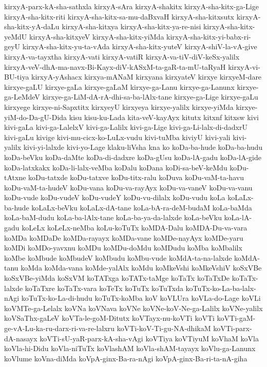 {kirxyA-parx-kA-sha-sathxla
kirxyA-sAra
kirxyA-shakitx
kirxyA-sha-kitx-ga-Lige
kirxyA-sha-kitx-riti
kirxyA-sha-kitx-sa-mu-daBxvaH
kirxyA-sha-kitxsutx
kirxyA-sha-kitx-yA-daLu
kirxyA-sha-kitxya
kirxyA-sha-kitx-ya-re-nisi
kirxyA-sha-kitx-yeMdU
kirxyA-sha-kitxyeV
kirxyA-sha-kitx-yiMda
kirxyA-sha-kitx-yi-babx-ri-geyU
kirxyA-sha-kitx-yu-ta-vAda
kirxyA-sha-kitx-yuteV
kirxyA-shiV-la-vA-give
kirxyA-va-tayxtha
kirxyA-vati
kirxyA-vatiR
kirxyA-va-tiV-diV-keSx-yalilx
kirxyA-veV-dhA-ma-navx-Bi-Kayx-diV-kASxM-ta-gaR-ta-mU-taRyaH
kirxyA-vi-BU-tiya
kirxyA-yAshacx
kirxya-mANaM
kirxyana
kirxyateV
kirxye
kirxyeM-dare
kirxye-gaLU
kirxye-gaLa
kirxye-gaLaM
kirxye-ga-Lanu
kirxye-ga-Lanunx
kirxye-ga-LeMdeV
kirxye-ga-LiM-dA-rA-dhi-sa-ba-lAlx-tane
kirxye-ga-Lige
kirxye-gaLu
kirxyege
kirxye-ni-Sapxtitx
kirxyeyU
kirxyeya
kirxye-yalilx
kirxye-yiMda
kirxye-yiM-do-Da-gU-Dida
kisu
kisu-ku-Lada
kita-veV-kayAyx
kitutx
kitxnf
kitxsw
kivi
kivi-gaLa
kivi-ga-LalelxV
kivi-ga-Lalilx
kivi-ga-Lige
kivi-ga-Li-lalx-di-dadxrU
kivi-gaLu
kivige
kivi-mu-cicx-ko-LuLx-vudu
kivi-tuMba
kiviyU
kivi-yali
kivi-yalilx
kivi-yi-lalxde
kivi-yo-Lage
klaku-liVsha
kna
ko
koDa-ba-hude
koDa-ba-hudu
koDa-beVku
koDa-daMte
koDa-di-dadxre
koDa-gUsu
koDa-lA-gadu
koDa-lA-gide
koDa-latxkakx
koDa-li-lalx-veMba
koDalu
koDana
koDi-sa-beV-keMdu
koDu-tAtxne
koDu-tatxde
koDu-tatxve
koDu-titx-ralu
koDuva
koDu-vaM-ta-havu
koDu-vaM-ta-hudeV
koDu-vana
koDu-va-rayAyx
koDu-va-vaneV
koDu-va-vanu
koDu-vude
koDu-vudeV
koDu-vudeY
koDu-vu-dilalx
koDu-vudu
koLa
koLaLx-ba-hude
koLaLx-beVku
koLaLx-dA-tane
koLa-bA-ra-deM-budaM
koLa-baMda
koLa-baM-dudu
koLa-ba-lAlx-tane
koLa-ba-ya-da-lalxde
koLa-beVku
koLa-lA-gadu
koLeLx
koLeLx-neMba
koLu-koTuTx
koMDA-Dalu
koMDA-Du-va-vara
koMDa
koMDaDe
koMDa-rayayx
koMDa-vane
koMDe-nayAyx
koMDe-yaru
koMDi
koMDo-yavxnu
koMDu
koMDu-doMdu
koMDudu
koMba
koMbalilx
koMbe
koMbude
koMbudeV
koMbudu
koMbu-vude
koMdA-ta-na-lalxde
koMdA-tanu
koMda
koMda-vana
koMde-yalAlx
koMdu
koMkeVshi
koMkeVshiV
koSxVBe
koSxVBe-yiMda
koSxVM
koTATxga
koTATx-taMge
koTaTx
koTaTxDe
koTaTx-lalxde
koTaTxre
koTaTx-vara
koTeTx
koTuTx
koTuTxda
koTuTx-ko-La-ba-lalx-nAgi
koTuTx-ko-La-di-hudu
koTuTx-koMba
koV
koVLUra
koVLa-do-Lage
koVLi
koVMTe-ga-Lelalx
koVNa
koVNava
koVNe
koVNe-koV-Ne-ga-Lalilx
koVNe-yalilx
koVSaThx-gaLeV
koVTa-le-goM-Ditutx
koVTayx-nu-koVTi
koVTi
koVTi-gaM-ge-vA-Lu-ka-ru-darx-ri-va-re-lalxru
koVTi-koV-Ti-gu-NA-dhikaM
koVTi-parx-dA-nasayx
koVTi-sU-yaR-parx-kA-sha-vAgi
koVTiya
koVTiyuM
koVhaM
koVla
koVla-hi-Didu
koVla-niTuTx
koVlashAM
koVla-shAM-tayayx
koVlu-ga-Lanunx
koVlume
koVna-diMda
koVpA-ginx-Ba-ra-nAgi
koVpA-ginx-Ba-ri-ta-nA-giha
}
